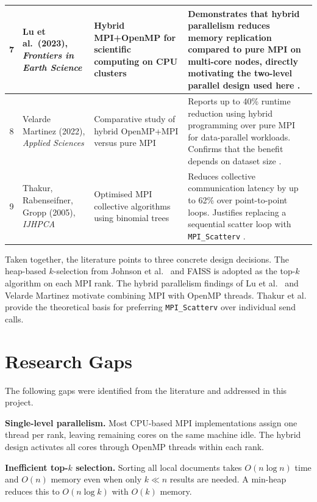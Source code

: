 \documentclass[12pt,a4paper]{article}
\begin{document}
\begin{longtable}{|c|p{3.2cm}|p{4.0cm}|p{6.8cm}|}
7 &
Lu et al.\ (2023), \textit{Frontiers in Earth Science} &
Hybrid MPI+OpenMP for scientific computing on CPU clusters &
Demonstrates that hybrid parallelism reduces memory replication
compared to pure MPI on multi-core nodes, directly motivating the
two-level parallel design used here \cite{lu2023hybrid}. \\
\hline

8 &
Velarde Martinez (2022), \textit{Applied Sciences} &
Comparative study of hybrid OpenMP+MPI versus pure MPI &
Reports up to 40\% runtime reduction using hybrid programming over
pure MPI for data-parallel workloads. Confirms that the benefit
depends on dataset size \cite{velarde2022hybrid}. \\
\hline

9 &
Thakur, Rabenseifner, Gropp (2005), \textit{IJHPCA} &
Optimised MPI collective algorithms using binomial trees &
Reduces collective communication latency by up to 62\% over
point-to-point loops. Justifies replacing a sequential scatter loop
with \texttt{MPI\_Scatterv} \cite{thakur2005mpi}. \\
\hline
\end{longtable}

Taken together, the literature points to three concrete design
decisions. The heap-based $k$-selection from Johnson et al.\
\cite{johnson2021faiss} and FAISS \cite{douze2024faiss} is adopted as
the top-$k$ algorithm on each MPI rank. The hybrid parallelism findings
of Lu et al.\ \cite{lu2023hybrid} and Velarde Martinez
\cite{velarde2022hybrid} motivate combining MPI with OpenMP threads.
Thakur et al.\ \cite{thakur2005mpi} provide the theoretical basis for
preferring \texttt{MPI\_Scatterv} over individual send calls.

\clearpage
\section{Research Gaps}

The following gaps were identified from the literature and addressed in
this project.

\textbf{Single-level parallelism.} Most CPU-based MPI implementations
assign one thread per rank, leaving remaining cores on the same machine
idle. The hybrid design activates all cores through OpenMP threads within
each rank.

\textbf{Inefficient top-$k$ selection.} Sorting all local documents
takes $O(n \log n)$ time and $O(n)$ memory even when only $k \ll n$
results are needed. A min-heap reduces this to $O(n \log k)$ with
$O(k)$ memory.
\end{document}
